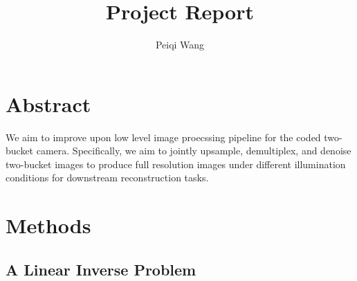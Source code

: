\documentclass[11pt]{article}
\title{Project Report}
\author{Peiqi Wang}
\begin{document}
\maketitle
\newpage 
\tableofcontents
\newpage


\section{Abstract}
We aim to improve upon low level image proecssing pipeline for the coded two-bucket camera. Specifically, we aim to jointly upsample, demultiplex, and denoise two-bucket images to produce full resolution images under different illumination conditions for downstream reconstruction tasks.


 

\section{Methods}

\subsection{A Linear Inverse Problem}
\end{document}
